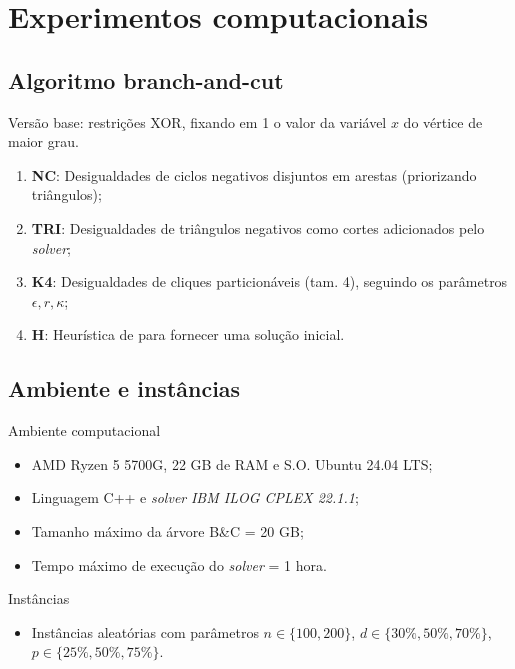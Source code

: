 \documentclass[
12pt,notheorems,hyperref={pdfauthor=whatever}
]{beamer}
\begin{document}
\section{Experimentos computacionais}

\subsection{Algoritmo branch-and-cut}

\begin{frame}
    
    Versão base: restrições XOR, fixando em 1 o valor da variável $x$ do vértice de maior grau. \\[1em]

    \pause
    
    \begin{enumerate}
        \item \textbf{NC}: Desigualdades de ciclos negativos disjuntos em arestas (priorizando triângulos);
        \pause
        \item \textbf{TRI}: Desigualdades de triângulos negativos como cortes adicionados pelo \textit{solver};
        \pause
        \item \textbf{K4}: Desigualdades de cliques particionáveis (tam. 4), seguindo os parâmetros $\epsilon, r, \kappa$;
        \pause
        \item \textbf{H}: Heurística de \cite{iacono2010determining} para fornecer uma solução inicial. 
    \end{enumerate}
    
\end{frame}

\subsection{Ambiente e instâncias}

\begin{frame}

    \begin{block}{Ambiente computacional}
        \begin{itemize}
            \item AMD Ryzen 5 5700G, 22 GB de RAM e S.O. Ubuntu 24.04 LTS;
            \item Linguagem C++ e \textit{solver} \textit{IBM ILOG CPLEX 22.1.1};
            \item Tamanho máximo da árvore B\&C = 20 GB;
            \item Tempo máximo de execução do \textit{solver} = 1 hora.
        \end{itemize}
    \end{block}

    \begin{block}{Instâncias}
        \begin{itemize}
            \item Instâncias aleatórias com parâmetros $n \in \{100,200\}$, $d \in \{30\%, 50\%, 70\%\}$, $p \in \{25\%, 50\%, 75\%\}$.
        \end{itemize}       
    \end{block}
    
\end{frame}
\end{document}
